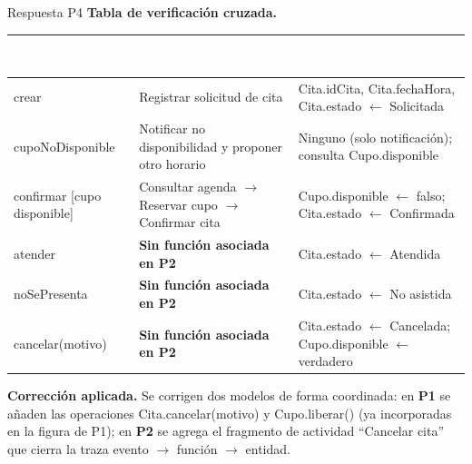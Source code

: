 \documentclass[11pt,a4paper,oneside]{article}
\newcommand{\hd}[1]{\cellcolor{darkblue}\textbf{\textcolor{white}{\small\sffamily #1}}}
\begin{document}
\begin{respuesta}{Respuesta P4}
\textbf{Tabla de verificaci\'on cruzada.}

\begin{center}\footnotesize
\begin{tabularx}{\linewidth}{@{}L{3.0cm} X X@{}}
\toprule
\hd{Evento (P3)} & \hd{Funci\'on/acci\'on que lo realiza (P2)} & \hd{Entidad/atributo que modifica (P1)}\\
\midrule
\textsf{crear} & Registrar solicitud de cita & \textsf{Cita.idCita}, \textsf{Cita.fechaHora},
\textsf{Cita.estado} $\leftarrow$ Solicitada\\
\textsf{cupoNoDisponible} & Notificar no disponibilidad y proponer otro horario & Ninguno (solo
notificaci\'on); consulta \textsf{Cupo.disponible}\\
\textsf{confirmar} [cupo disponible] & Consultar agenda $\rightarrow$ Reservar cupo $\rightarrow$
Confirmar cita & \textsf{Cupo.disponible} $\leftarrow$ falso; \textsf{Cita.estado} $\leftarrow$
Confirmada\\
\textsf{atender} & \textbf{Sin funci\'on asociada en P2} & \textsf{Cita.estado} $\leftarrow$ Atendida\\
\textsf{noSePresenta} & \textbf{Sin funci\'on asociada en P2} & \textsf{Cita.estado} $\leftarrow$
No asistida\\
\textsf{cancelar(motivo)} & \textbf{Sin funci\'on asociada en P2} & \textsf{Cita.estado} $\leftarrow$
Cancelada; \textsf{Cupo.disponible} $\leftarrow$ verdadero\\
\bottomrule
\end{tabularx}
\end{center}

\textbf{Correcci\'on aplicada.} Se corrigen dos modelos de forma coordinada: en \textbf{P1} se
a\~naden las operaciones \textsf{Cita.cancelar(motivo)} y \textsf{Cupo.liberar()} (ya incorporadas en
la figura de P1); en \textbf{P2} se agrega el fragmento de actividad ``Cancelar cita'' que cierra la
traza evento $\rightarrow$ funci\'on $\rightarrow$ entidad.

\begin{center}
\setlength{\fboxsep}{8pt}\colorbox{white}{%
}
\end{center}
\end{respuesta}
\end{document}
